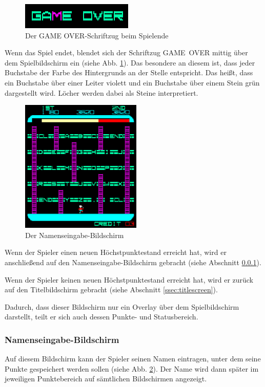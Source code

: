 \documentclass[12pt]{article}
\begin{document}
\begin{figure}[ht]
		\centering
        \includegraphics{images/game-over}
        \caption{Der GAME OVER-Schriftzug beim Spielende}
        \label{fig:spacepanic:gameover}
	\end{figure}

Wenn das Spiel endet, blendet sich der Schriftzug \mbox{GAME OVER} mittig über dem Spielbildschirm ein (siehe Abb. \ref{fig:spacepanic:gameover}). Das besondere an diesem ist, dass jeder Buchstabe der Farbe des Hintergrunds an der Stelle entspricht. Das heißt, dass ein Buchstabe über einer Leiter violett und ein Buchstabe über einem Stein grün dargestellt wird. Löcher werden dabei als Steine interpretiert.

  \begin{figure}[ht]
		\centering
        \includegraphics[height=180pt]{images/entername}
        \caption{Der Namenseingabe-Bildschirm}
        \label{fig:spacepanic:entername}
	\end{figure}
  
    Wenn der Spieler einen neuen Höchstpunktestand erreicht hat, wird er anschließend auf den Namenseingabe-Bildschirm gebracht (siehe Abschnitt \ref{ssec:entername}).
    
    Wenn der Spieler keinen neuen Höchstpunktestand erreicht hat, wird er zurück auf den Titelbildschirm gebracht (siehe Abschnitt \ref{ssec:titlescreen}).

Dadurch, dass dieser Bildschirm nur ein Overlay über dem Spielbildschirm darstellt, teilt er sich auch dessen Punkte- und Statusbereich.


\subsubsection{Namenseingabe-Bildschirm} \label{ssec:entername}
Auf diesem Bildschirm kann der Spieler seinen Namen eintragen, unter dem seine Punkte gespeichert werden sollen (siehe Abb. \ref{fig:spacepanic:entername}). Der Name wird dann später im jeweiligen Punktebereich auf sämtlichen Bildschirmen angezeigt.
\end{document}
